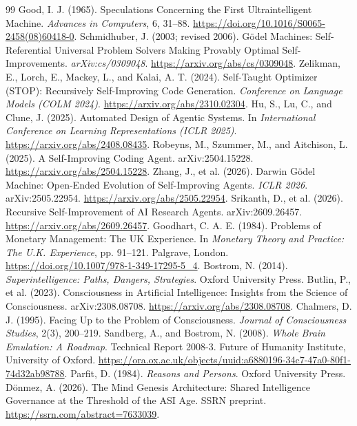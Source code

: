 \documentclass[11pt,a4paper]{article}
\begin{document}
\begin{thebibliography}{99}
 Good, I. J. (1965).
Speculations Concerning the First Ultraintelligent Machine.
\emph{Advances in Computers}, 6, 31--88.
\url{https://doi.org/10.1016/S0065-2458(08)60418-0}.
 Schmidhuber, J. (2003;
revised 2006).
G\"odel Machines: Self-Referential Universal Problem
Solvers Making Provably Optimal Self-Improvements.
\emph{arXiv:cs/0309048}.
\url{https://arxiv.org/abs/cs/0309048}.
Zelikman, E., Lorch, E., Mackey, L., and Kalai, A. T.
(2024).
Self-Taught Optimizer (STOP): Recursively
Self-Improving Code Generation.
\emph{Conference on Language Models (COLM 2024)}.
\url{https://arxiv.org/abs/2310.02304}.
Hu, S., Lu, C., and Clune, J. (2025).
Automated Design of Agentic Systems.
In \emph{International Conference on
Learning Representations (ICLR 2025)}.
\url{https://arxiv.org/abs/2408.08435}.
 Robeyns, M., Szummer, M., and Aitchison, L. (2025). A Self-Improving Coding Agent. arXiv:2504.15228. \url{https://arxiv.org/abs/2504.15228}.
 Zhang, J., et al. (2026). Darwin G\"odel Machine: Open-Ended Evolution of Self-Improving Agents. \emph{ICLR 2026}. arXiv:2505.22954. \url{https://arxiv.org/abs/2505.22954}.
 Srikanth, D., et al. (2026). Recursive Self-Improvement of AI Research Agents. arXiv:2609.26457. \url{https://arxiv.org/abs/2609.26457}.
 Goodhart, C. A. E. (1984).
Problems of Monetary Management: The UK Experience.
In \emph{Monetary Theory and Practice: The U.K. Experience},
pp. 91--121. Palgrave, London.
\url{https://doi.org/10.1007/978-1-349-17295-5_4}.
 Bostrom, N. (2014). \emph{Superintelligence: Paths, Dangers, Strategies}. Oxford University Press.
 Butlin, P., et al. (2023). Consciousness in Artificial Intelligence: Insights from the Science of Consciousness. arXiv:2308.08708. \url{https://arxiv.org/abs/2308.08708}.
 Chalmers, D. J. (1995). Facing Up to the Problem of Consciousness. \emph{Journal of Consciousness Studies}, 2(3), 200--219.
 Sandberg, A., and Bostrom, N. (2008).
\emph{Whole Brain Emulation: A Roadmap}.
Technical Report 2008-3.
Future of Humanity Institute, University of Oxford.
\url{https://ora.ox.ac.uk/objects/uuid:a6880196-34c7-47a0-80f1-74d32ab98788}.
 Parfit, D. (1984). \emph{Reasons and Persons}. Oxford University Press.
 D\"onmez, A. (2026). The Mind Genesis Architecture: Shared Intelligence Governance at the Threshold of the ASI Age. SSRN preprint. \url{https://ssrn.com/abstract=7633039}.

\end{thebibliography}
\end{document}

